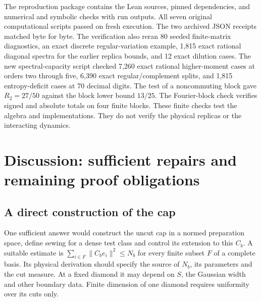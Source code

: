 \documentclass[11pt]{article}
\newcommand{\parttitle}[2]{\section{#1}}
\begin{document}
The reproduction package contains the Lean sources, pinned dependencies, and numerical and symbolic checks with run outputs. All seven original computational scripts passed on fresh execution. The two archived JSON receipts matched byte for byte. The verification also reran 80 seeded finite-matrix diagnostics, an exact discrete regular-variation example, 1,815 exact rational diagonal spectra for the earlier replica bounds, and 12 exact dilution cases. The new spectral-capacity script checked 7,260 exact rational higher-moment cases at orders two through five, 6,390 exact regular/complement splits, and 1,815 entropy-deficit cases at 70 decimal digits. The test of a noncommuting block gave $R_2=27/50$ against the block lower bound $13/25$. The Fourier-block check verifies signed and absolute totals on four finite blocks. These finite checks test the algebra and implementations. They do not verify the physical replicas or the interacting dynamics.

\parttitle{Discussion: sufficient repairs and remaining proof obligations}{What would resolve the questions?}\label{sec:discussion}
\subsection{A direct construction of the cap}
One sufficient answer would construct the uncut cap in a normed preparation space, define sewing for a dense test class and control its extension to this $C_b$. A suitable estimate is $\sum_{i\in F}\|C_be_i\|^2\le N_b$ for every finite subset $F$ of a complete basis. Its physical derivation should specify the source of $N_b$, its parameters and the cut measure. At a fixed diamond it may depend on $S$, the Gaussian width and other boundary data. Finite dimension of one diamond requires uniformity over its cuts only.
\end{document}

